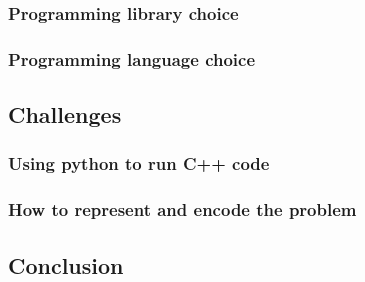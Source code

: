 \documentclass[12pt]{article}
\begin{document}
\subsubsection{Programming library choice}
\subsubsection{Programming language choice}
\subsection{Challenges}
\subsubsection{Using python to run C++ code}
\subsubsection{How to represent and encode the problem}
\subsection{Conclusion}
\end{document}
